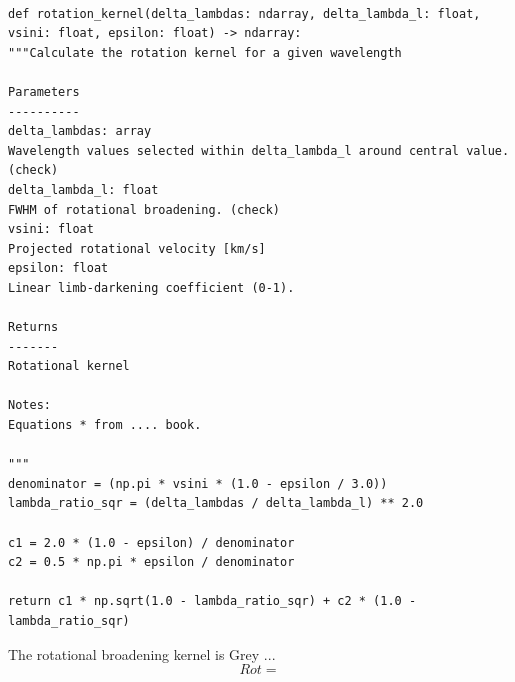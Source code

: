 \begin{lstlisting}

def rotation_kernel(delta_lambdas: ndarray, delta_lambda_l: float, vsini: float, epsilon: float) -> ndarray:
"""Calculate the rotation kernel for a given wavelength

Parameters
----------
delta_lambdas: array
Wavelength values selected within delta_lambda_l around central value. (check)
delta_lambda_l: float
FWHM of rotational broadening. (check)
vsini: float
Projected rotational velocity [km/s]
epsilon: float
Linear limb-darkening coefficient (0-1).

Returns
-------
Rotational kernel

Notes:
Equations * from .... book.

"""
denominator = (np.pi * vsini * (1.0 - epsilon / 3.0))
lambda_ratio_sqr = (delta_lambdas / delta_lambda_l) ** 2.0

c1 = 2.0 * (1.0 - epsilon) / denominator
c2 = 0.5 * np.pi * epsilon / denominator

return c1 * np.sqrt(1.0 - lambda_ratio_sqr) + c2 * (1.0 - lambda_ratio_sqr)
\end{lstlisting}

The rotational broadening kernel is {Grey ...}
\begin{equation}
Rot =
\end{equation}
